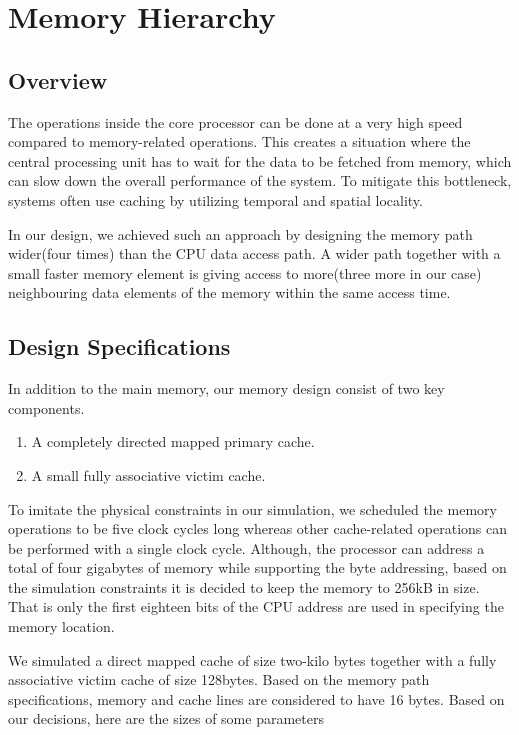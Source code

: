 \documentclass[12pt]{article}
\begin{document}
    \section{Memory Hierarchy}

    \subsection{Overview}
    The operations inside the core processor can be done at a very high speed compared to memory-related operations.
    This creates a situation where the central processing unit has to wait for the data to be fetched from memory, which can slow down the overall performance of the system.
    To mitigate this bottleneck, systems often use caching by utilizing temporal and spatial locality.
    \par
    In our design, we achieved such an approach by designing the memory path wider(four times) than the CPU data access path.
    A wider path together with a small faster memory element is giving access to more(three more in our case) neighbouring data elements of the memory within the same access time.

    \subsection{Design Specifications}
    In addition to the main memory, our memory design consist of two key components.
    \begin{enumerate}
        \item A completely directed mapped primary cache.
        \item A small fully associative victim cache.
    \end{enumerate}
    To imitate the physical constraints in our simulation, we scheduled the memory operations to be five clock cycles long whereas other cache-related operations can be performed with a single clock cycle.
    Although, the processor can address a total of four gigabytes of memory while supporting the byte addressing, based on the simulation constraints it is decided to keep the memory to 256kB in size.
    That is only the first eighteen bits of the CPU address are used in specifying the memory location.
    \par
    We simulated a direct mapped cache of size two-kilo bytes together with a fully associative victim cache of size 128bytes.
    Based on the memory path specifications, memory and cache lines are considered to have 16 bytes.
    Based on our decisions, here are the sizes of some parameters
\end{document}
